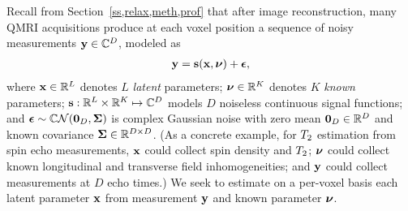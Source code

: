 Recall from Section~\ref{ss,relax,meth,prof}
that after image reconstruction,
many QMRI acquisitions 
produce at each voxel position
a sequence of noisy measurements
$\mathbf{y} \in \mathbb{C}^{D}$, 
modeled as
\begin{align}
	\bmy = \bmsa{\bmx, \bmnu} + \bmeps,
	\label{eq:perk,model}
\end{align}
where $\mathbf{x} \in \mathbb{R}^{L}$ denotes $L$ \emph{latent} parameters;
$\boldsymbol{\nu} \in \mathbb{R}^{K}$ denotes $K$ \emph{known} parameters;  
$\mathbf{s} : \mathbb{R}^{L} \times \mathbb{R}^{K} \mapsto \mathbb{C}^{D}$ 
models $D$ noiseless continuous signal functions;
and $\bmeps \sim \cgauss{\zeros{D}}{\bmSig}$ is complex Gaussian noise
with zero mean $\boldsymbol{0}_{D} \in \mathbb{R}^{D}$
and known covariance $\boldsymbol{\Sigma} \in \mathbb{R}^{D \times D}$.
(As a concrete example,
for $T_2$ estimation
from spin echo measurements,
$\mathbf{x}$ could collect spin density and $T_2$;
$\boldsymbol{\nu}$ could collect known longitudinal and transverse field inhomogeneities;
and 
$\mathbf{y}$ could collect measurements at $D$ echo times.)
We seek to estimate 
on a per-voxel basis
each latent parameter $\mathbf{x}$
from measurement $\mathbf{y}$ 
and known parameter $\boldsymbol{\nu}$.

